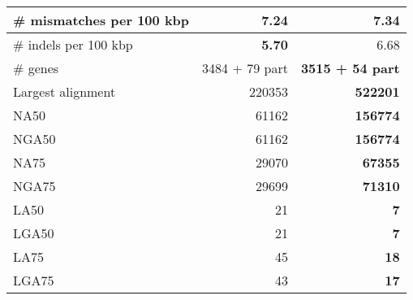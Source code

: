 \documentclass[12pt,a4paper]{article}
\begin{document}
\begin{table}[ht]
\begin{center}
\begin{tabular}{|l*{2}{|r}|}
\# mismatches per 100 kbp & {\bf 7.24} & 7.34 \\ \hline
\# indels per 100 kbp & {\bf 5.70} & 6.68 \\ \hline
\# genes & 3484 + 79 part & {\bf 3515 + 54 part} \\ \hline
Largest alignment & 220353 & {\bf 522201} \\ \hline
NA50 & 61162 & {\bf 156774} \\ \hline
NGA50 & 61162 & {\bf 156774} \\ \hline
NA75 & 29070 & {\bf 67355} \\ \hline
NGA75 & 29699 & {\bf 71310} \\ \hline
LA50 & 21 & {\bf 7} \\ \hline
LGA50 & 21 & {\bf 7} \\ \hline
LA75 & 45 & {\bf 18} \\ \hline
LGA75 & 43 & {\bf 17} \\ \hline
\end{tabular}
\end{center}
\end{table}
\end{document}

